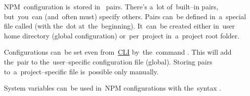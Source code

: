 \label{npmconfiguration}
NPM~configuration is~stored in~ pairs.
There's a~lot of~built--in pairs, but~you~can (and~often must) specify others.
Pairs can~be defined in~a~special file called  (with the~dot at~the~beginning).
It~can~be created either in~user home directory (global configuration) or~per~project in~a~project root folder.

Configurations can~be set even from~\hyperref[shellcligui]{CLI} by~the~command .
This will add the~pair to the~user--specific configuration file (global).
Storing pairs to~a~project--specific  file is~possible only manually.

\note System variables can~be used in~NPM configurations with the~syntax .
